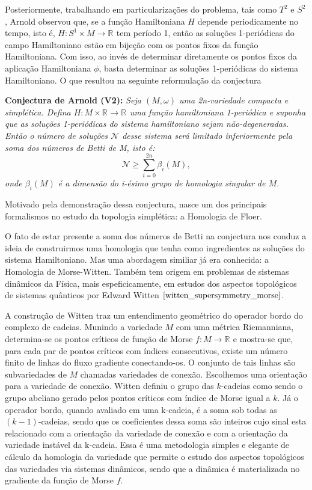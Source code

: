 \documentclass[12pt]{book}
\newcommand{\circulo}{S^{1}}
\newcommand{\circulovariedade}{\circulo\times M}
\newcommand{\real}[1]{\mathbb{R}^{#1}}
\newcommand{\reta}{\real{}}
\begin{document}
	Posteriormente, trabalhando em particularizações do problema, tais como $T^{2}$ e $S^{2}$, Arnold observou que, se a função Hamiltoniana $H$ depende periodicamente no tempo, isto é, $H:\circulovariedade\to \reta$ tem período 1, então as soluções 1-periódicas do campo Hamiltoniano estão em bijeção com os pontos fixos da função Hamiltoniana. Com isso, ao invés de determinar diretamente os pontos fixos da aplicação Hamiltoniana $\phi$, basta determinar as soluções 1-periódicas do sistema Hamiltoniano. O que resultou na seguinte reformulação da conjectura
	
	\textbf{Conjectura de Arnold (V2):} \textit	{Seja $(M,\omega)$ uma 2n-variedade compacta e simplética. Defina $H:M\times \real{} \to \reta$ uma função hamiltoniana 1-periódica e suponha que as soluções 1-periódicas do sistema hamiltoniano sejam não-degeneradas. Então o número de soluções $\mathcal{N}$ desse sistema será limitado inferiormente pela soma dos números de Betti de M, isto é:
		$$
		\mathcal{N}\geq \sum_{i=0}^{2n}\beta_{i}(M),
		$$
		onde $\beta_{i}(M)$ é a dimensão do i-ésimo grupo de homologia singular de $M$.}
	
	Motivado pela demonstração dessa conjectura, nasce um dos principais formalismos no estudo da topologia simplética: a Homologia de Floer.
	
	O fato de estar presente a soma dos números de Betti na conjectura nos conduz a ideia de construirmos uma homologia que tenha como ingredientes as soluções do sistema Hamiltoniano. Mas uma abordagem similiar já era conhecida: a Homologia de Morse-Witten. Também tem origem em problemas de sistemas dinâmicos da Física, mais espeficicamente, em estudos dos aspectos topológicos de sistemas quânticos por Edward Witten $\cite{witten_supersymmetry_morse}$.
	
	A construção de Witten traz um entendimento geométrico do operador bordo do complexo de cadeias. Munindo a variedade $M$ com uma métrica Riemanniana, determina-se os pontos críticos de função de Morse $f: M \to \reta$ e mostra-se que, para cada par de pontos críticos com índices consecutivos, existe um número finito de linhas do fluxo gradiente conectando-os. O conjunto de tais linhas são subvariedades de $M$ chamadas variedades de conexão. Escolhemos  uma orientação para a variedade de conexão. Witten definiu o grupo das $k$-cadeias como sendo o grupo abeliano gerado pelos pontos críticos com índice de Morse igual a $k$. Já o operador bordo, quando avaliado em uma k-cadeia, é a soma sob todas as $(k-1)$-cadeias, sendo que os coeficientes dessa soma são inteiros cujo sinal esta relacionado com a orientação da variedade de conexão e com a orientação da variedade instável da k-cadeia. Essa é uma metodologia simples e elegante de cálculo da homologia da variedade que permite o estudo dos aspectos topológicos das variedades via sistemas dinâmicos, sendo que a dinâmica é materializada no gradiente da função de Morse $f$.
	
\end{document}
